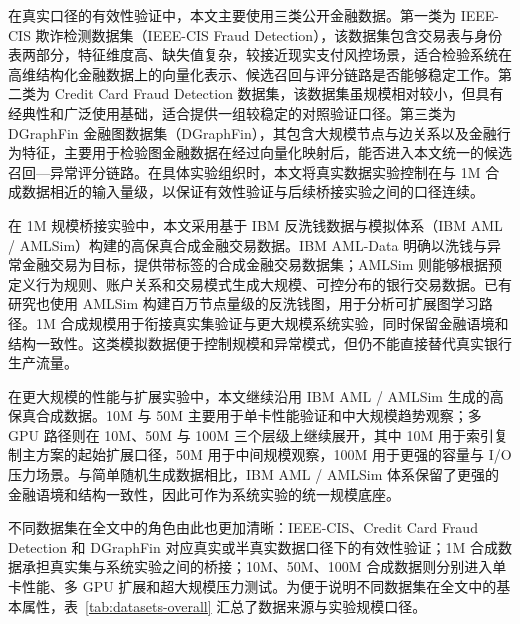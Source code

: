 在真实口径的有效性验证中，本文主要使用三类公开金融数据。第一类为 IEEE-CIS 欺诈检测数据集（IEEE-CIS Fraud Detection），该数据集包含交易表与身份表两部分，特征维度高、缺失值复杂，较接近现实支付风控场景，适合检验系统在高维结构化金融数据上的向量化表示、候选召回与评分链路是否能够稳定工作\citep{ieee_cis_fraud}。第二类为 Credit Card Fraud Detection 数据集，该数据集虽规模相对较小，但具有经典性和广泛使用基础，适合提供一组较稳定的对照验证口径\citep{dalpozzolo2015creditcard,creditcardfraud_kaggle}。第三类为 DGraphFin 金融图数据集（DGraphFin），其包含大规模节点与边关系以及金融行为特征，主要用于检验图金融数据在经过向量化映射后，能否进入本文统一的候选召回---异常评分链路\citep{dgraphfin_paper,dgraphfin_site,dgraphfin_baseline}。在具体实验组织时，本文将真实数据实验控制在与 1M 合成数据相近的输入量级，以保证有效性验证与后续桥接实验之间的口径连续。

在 1M 规模桥接实验中，本文采用基于 IBM 反洗钱数据与模拟体系（IBM AML / AMLSim）构建的高保真合成金融交易数据。IBM AML-Data 明确以洗钱与异常金融交易为目标，提供带标签的合成金融交易数据集；AMLSim 则能够根据预定义行为规则、账户关系和交易模式生成大规模、可控分布的银行交易数据\citep{ibm_aml_data,ibm_amlsim}。已有研究也使用 AMLSim 构建百万节点量级的反洗钱图，用于分析可扩展图学习路径\citep{weber2018scalableaml}。1M 合成规模用于衔接真实集验证与更大规模系统实验，同时保留金融语境和结构一致性。这类模拟数据便于控制规模和异常模式，但仍不能直接替代真实银行生产流量。

在更大规模的性能与扩展实验中，本文继续沿用 IBM AML / AMLSim 生成的高保真合成数据。10M 与 50M 主要用于单卡性能验证和中大规模趋势观察；多 GPU 路径则在 10M、50M 与 100M 三个层级上继续展开，其中 10M 用于索引复制主方案的起始扩展口径，50M 用于中间规模观察，100M 用于更强的容量与 I/O 压力场景。与简单随机生成数据相比，IBM AML / AMLSim 体系保留了更强的金融语境和结构一致性，因此可作为系统实验的统一规模底座。

不同数据集在全文中的角色由此也更加清晰：IEEE-CIS、Credit Card Fraud Detection 和 DGraphFin 对应真实或半真实数据口径下的有效性验证；1M 合成数据承担真实集与系统实验之间的桥接；10M、50M、100M 合成数据则分别进入单卡性能、多 GPU 扩展和超大规模压力测试。为便于说明不同数据集在全文中的基本属性，表~\ref{tab:datasets-overall} 汇总了数据来源与实验规模口径。

